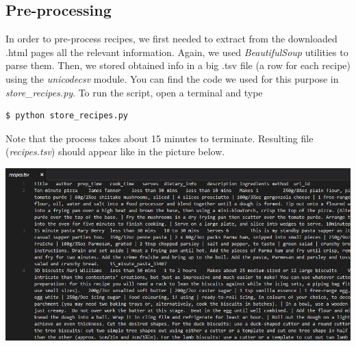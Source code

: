 \subsection{Pre-processing}

In order to pre-process recipes, we first needed to extract from the downloaded .html pages all the relevant information. Again, we used \textit{BeautifulSoup}\cite{beaut_soup} utilities to parse them. Then, we stored obtained info in a big .tsv file (a row for each recipe) using the \textit{unicodecsv}\cite{csv} module. You can find the code we used for this purpose in \textit{store\_recipes.py}. To run the script, open a terminal and type
\begin{lstlisting}
$ python store_recipes.py
\end{lstlisting}
Note that the process takes about 15 minutes to terminate. Resulting file (\textit{recipes.tsv}) should appear like in the picture below.
\begin{center}
	\vspace{5mm}
	\includegraphics[scale=0.5]{img/recipes-tsv.jpg}
\end{center}

\bigskip

